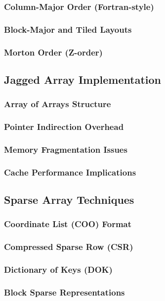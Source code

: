 \documentclass[12pt, oneside]{book}
\begin{document}
\subsubsection{Column-Major Order (Fortran-style)}
\subsubsection{Block-Major and Tiled Layouts}
\subsubsection{Morton Order (Z-order)}

\subsection{Jagged Array Implementation}
\subsubsection{Array of Arrays Structure}
\subsubsection{Pointer Indirection Overhead}
\subsubsection{Memory Fragmentation Issues}
\subsubsection{Cache Performance Implications}

\subsection{Sparse Array Techniques}
\subsubsection{Coordinate List (COO) Format}
\subsubsection{Compressed Sparse Row (CSR)}
\subsubsection{Dictionary of Keys (DOK)}
\subsubsection{Block Sparse Representations}
\end{document}
